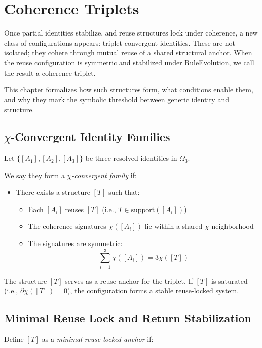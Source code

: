 \chapter{Coherence Triplets}

Once partial identities stabilize, and reuse structures lock under
coherence, a new class of configurations appears: triplet-convergent
identities. These are not isolated; they cohere through mutual reuse of
a shared structural anchor. When the reuse configuration is symmetric
and stabilized under RuleEvolution, we call the result a coherence
triplet.

This chapter formalizes how such structures form, what conditions enable
them, and why they mark the symbolic threshold between generic identity
and structure.

\section{$\chi$-Convergent Identity Families} \label{chi-convergent-identity-families}

Let $\{ [A_1], [A_2], [A_3] \}$ be three resolved identities in $\Omega_3$.

We say they form a \textit{$\chi$-convergent family} if:

\begin{itemize}
  \item There exists a structure $[T]$ such that:
  \begin{itemize}
    \item Each $[A_i]$ reuses $[T]$ (i.e., $T \in \text{support}([A_i])$)
    \item The coherence signatures $\chi([A_i])$ lie within a shared $\chi$-neighborhood
    \item The signatures are symmetric:
    \[
      \sum_{i=1}^3 \chi([A_i]) = 3 \chi([T])
    \]
  \end{itemize}
\end{itemize}

The structure $[T]$ serves as a reuse anchor for the triplet.  
If $[T]$ is saturated (i.e., $\partial \chi([T]) = 0$),  
the configuration forms a stable reuse-locked system.

\section{Minimal Reuse Lock and Return Stabilization} \label{minimal-reuse-lock-and-return-stabilization}

Define $[T]$ as a \textit{minimal reuse-locked anchor} if:


